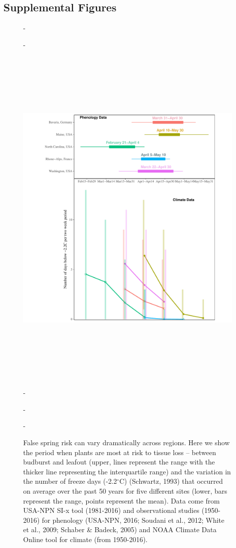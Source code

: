 \documentclass{article}\usepackage[]{graphicx}\usepackage[]{color}
\begin{document}
\newpage
\subsection*{Supplemental Figures}
\begin{figure} [H] 
 -\begin{center}
 -\includegraphics[width=16cm, height=18cm]{..//figure/RegRisk_flipped.pdf} 
 -\caption{False spring risk can vary dramatically across regions. Here we show the period when plants are most at risk to tissue loss -- between budburst and leafout (upper, lines represent the range with the thicker line representing the interquartile range) and the variation in the number of freeze days (-2.2$^{\circ}$C) (Schwartz, 1993) that occurred on average over the past 50 years for five different sites (lower, bars represent the range, points represent the mean). Data come from USA-NPN SI-x tool (1981-2016) and observational studies (1950-2016) for phenology (USA-NPN, 2016; Soudani et al., 2012; White et al., 2009; Schaber \& Badeck, 2005) and NOAA Climate Data Online tool for climate (from 1950-2016). } \label{fig:regional}  
 -\end{center}
 -\end{figure}


\newpage
\nocite{Flynn}

\end{document}
